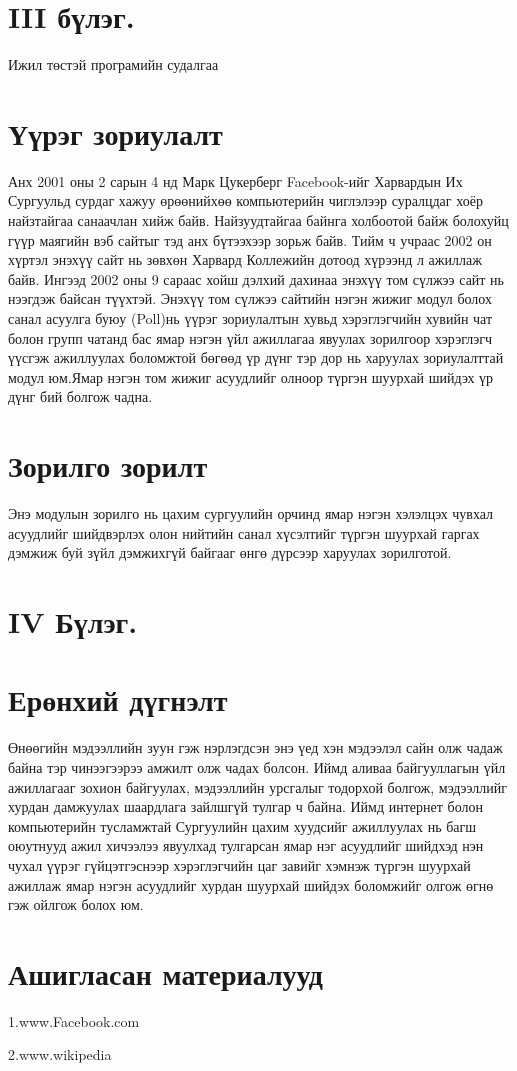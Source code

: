 \documentclass[12pt]{article}
\begin{document}
	
\section     {III бүлэг.} Ижил төстэй програмийн судалгаа
	
\section	 {Үүрэг зориулалт}
 
             Анх 2001 оны 2 сарын 4 нд Марк Цукерберг Facebook-ийг Харвардын Их Сургуульд сурдаг хажуу өрөөнийхөө компьютерийн чиглэлээр суралцдаг хоёр найзтайгаа санаачлан хийж байв. Найзуудтайгаа байнга холбоотой байж болохуйц гүүр маягийн вэб сайтыг тэд анх бүтээхээр зорьж байв. Тийм ч учраас 2002 он хүртэл энэхүү сайт нь зөвхөн Харвард Коллежийн дотоод хүрээнд л ажиллаж байв. Ингээд 2002 оны 9 сараас хойш дэлхий дахинаа энэхүү том сүлжээ сайт нь нээгдэж байсан түүхтэй. Энэхүү том сүлжээ сайтийн нэгэн жижиг модул болох санал асуулга буюу (Poll)нь үүрэг зориулалтын хувьд хэрэглэгчийн хувийн чат болон групп чатанд бас ямар нэгэн үйл ажиллагаа явуулах зорилгоор хэрэглэгч үүсгэж ажиллуулах боломжтой бөгөөд үр дүнг тэр дор нь харуулах зориулалттай модул юм.Ямар нэгэн том жижиг асуудлийг олноор түргэн шуурхай шийдэх үр дүнг бий болгож чадна.  
	
	
	
\section     {Зорилго зорилт}

             Энэ модулын зорилго нь цахим сургуулийн орчинд ямар нэгэн хэлэлцэх чувхал асуудлийг шийдвэрлэх олон нийтийн санал хүсэлтийг түргэн шуурхай гаргах дэмжиж буй зүйл дэмжихгүй байгааг өнгө дүрсээр харуулах 
             зорилготой.
             
             
             
             
\section     {IV Бүлэг.} 
             
\section     {Ерөнхий дүгнэлт}  
             
             
             Өнөөгийн мэдээллийн зуун гэж нэрлэгдсэн энэ үед хэн мэдээлэл сайн олж чадаж байна тэр чинээгээрээ амжилт олж чадах болсон. Иймд аливаа байгууллагын үйл ажиллагааг зохион байгуулах, мэдээллийн урсгалыг тодорхой болгож, мэдээллийг хурдан дамжуулах шаардлага зайлшгүй тулгар ч байна. Иймд интернет болон компьютерийн тусламжтай Сургуулийн цахим хуудсийг ажиллуулах нь багш оюутнууд ажил хичээлээ явуулхад тулгарсан ямар нэг асуудлийг шийдхэд нэн чухал үүрэг гүйцэтгэснээр хэрэглэгчийн цаг завийг хэмнэж түргэн шуурхай ажиллаж ямар нэгэн асуудлийг хурдан шуурхай шийдэх боломжийг олгож өгнө гэж ойлгож болох юм.
             
               
             
\section     {Ашигласан материалууд}   
             
             
             1.www.Facebook.com   
             
             2.www.wikipedia  
             
\end{document}
